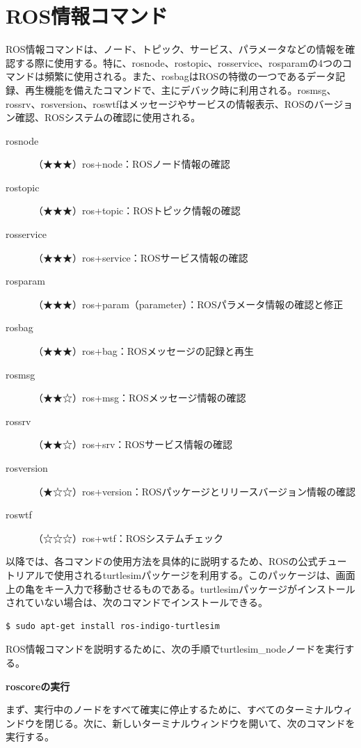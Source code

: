 \section{ROS情報コマンド}

ROS情報コマンドは、ノード、トピック、サービス、パラメータなどの情報を確認する際に使用する。特に、rosnode、rostopic、rosservice、rosparamの4つのコマンドは頻繁に使用される。また、rosbagはROSの特徴の一つであるデータ記録、再生機能を備えたコマンドで、主にデバック時に利用される。rosmsg、rossrv、rosversion、roswtfはメッセージやサービスの情報表示、ROSのバージョン確認、ROSシステムの確認に使用される。

\vspace{\baselineskip}
\noindent
\begin{description}
\item[rosnode]（★★★）ros+node：ROSノード情報の確認
\item[rostopic]（★★★）ros+topic：ROSトピック情報の確認
\item[rosservice]（★★★）ros+service：ROSサービス情報の確認
\item[rosparam] （★★★）ros+param（parameter）：ROSパラメータ情報の確認と修正
\item[rosbag]（★★★）ros+bag：ROSメッセージの記録と再生
\item[rosmsg]（★★☆）ros+msg：ROSメッセージ情報の確認
\item[rossrv] （★★☆）ros+srv：ROSサービス情報の確認
\item[rosversion]（★☆☆）ros+version：ROSパッケージとリリースバージョン情報の確認
\item[roswtf]（☆☆☆）ros+wtf：ROSシステムチェック
\end{description}

以降では、各コマンドの使用方法を具体的に説明するため、ROSの公式チュートリアルで使用されるturtlesimパッケージを利用する。このパッケージは、画面上の亀をキー入力で移動させるものである。turtlesimパッケージがインストールされていない場合は、次のコマンドでインストールできる。

\begin{lstlisting}[language=ROS]
$ sudo apt-get install ros-indigo-turtlesim
\end{lstlisting}

ROS情報コマンドを説明するために、次の手順でturtlesim\_nodeノードを実行する。

\textbf{roscoreの実行}

まず、実行中のノードをすべて確実に停止するために、すべてのターミナルウィンドウを閉じる。次に、新しいターミナルウィンドウを開いて、次のコマンドを実行する。

